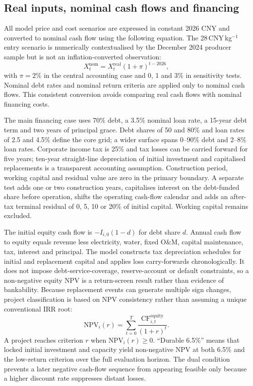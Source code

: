 \documentclass[11pt,a4paper]{article}
\begin{document}
\subsection{Real inputs, nominal cash flows and financing}

All model price and cost scenarios are expressed in constant 2026 CNY and converted to nominal cash flow using the following equation. The 28\,CNY\,kg$^{-1}$ entry scenario is numerically contextualised by the December 2024 producer sample but is not an inflation-converted observation:
\begin{equation}
X_t^{\mathrm{nom}}=X_t^{\mathrm{real}}(1+\pi)^{t-2026},
\label{eq:nominalisation}
\end{equation}
with $\pi=2\%$ in the central accounting case and 0, 1 and 3\% in sensitivity tests. Nominal debt rates and nominal return criteria are applied only to nominal cash flows. This consistent conversion avoids comparing real cash flows with nominal financing costs.

The main financing case uses 70\% debt, a 3.5\% nominal loan rate, a 15-year debt term and two years of principal grace. Debt shares of 50 and 80\% and loan rates of 2.5 and 4.5\% define the core grid; a wider surface spans 0--90\% debt and 2--8\% loan rates. Corporate income tax is 25\% and tax losses can be carried forward for five years; ten-year straight-line depreciation of initial investment and capitalised replacements is a transparent accounting assumption. Construction period, working capital and residual value are zero in the primary boundary. A separate test adds one or two construction years, capitalises interest on the debt-funded share before operation, shifts the operating cash-flow calendar and adds an after-tax terminal residual of 0, 5, 10 or 20\% of initial capital. Working capital remains excluded.

The initial equity cash flow is $-I_{i,0}(1-d)$ for debt share $d$. Annual cash flow to equity equals revenue less electricity, water, fixed O\&M, capital maintenance, tax, interest and principal. The model constructs tax depreciation schedules for initial and replacement capital and applies loss carry-forwards chronologically. It does not impose debt-service-coverage, reserve-account or default constraints, so a non-negative equity NPV is a return-screen result rather than evidence of bankability. Because replacement events can generate multiple sign changes, project classification is based on NPV consistency rather than assuming a unique conventional IRR root:
\begin{equation}
\mathrm{NPV}_i(r)=\sum_{t=0}^{T}\frac{\mathrm{CF}_{i,t}^{\mathrm{equity}}}{(1+r)^t}.
\label{eq:npv}
\end{equation}
A project reaches criterion $r$ when $\mathrm{NPV}_i(r)\geq0$. ``Durable 6.5\%'' means that locked initial investment and capacity yield non-negative NPV at both 6.5\% and the low-return criterion over the full evaluation horizon. The dual condition prevents a later negative cash-flow sequence from appearing feasible only because a higher discount rate suppresses distant losses.
\end{document}
